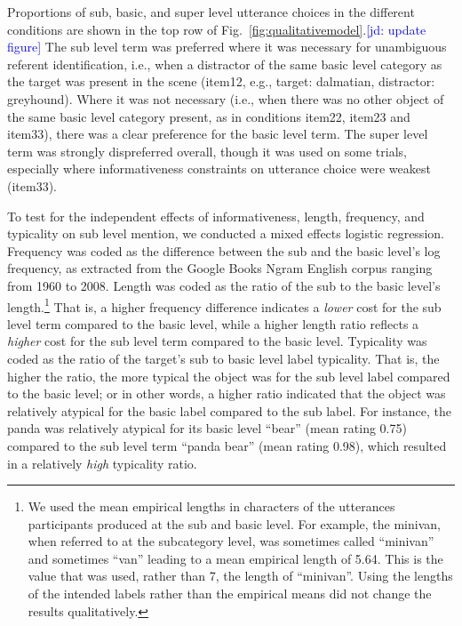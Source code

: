 \documentclass[10pt,letterpaper]{article}
\newcommand{\jd}[1]{\textcolor{Blue}{[jd: #1]}}
\newcommand{\figref}[1]{Fig.~\ref{#1}}
\begin{document}
Proportions of sub, basic, and super level utterance choices in the different conditions are shown in the top row of \figref{fig:qualitativemodel}.\jd{update figure} The sub level term was preferred where it was necessary for unambiguous referent identification, i.e., when a distractor of the same basic level category as the target was present in the scene (item12, e.g., target: dalmatian, distractor: greyhound). Where it was not necessary (i.e., when there was no other object of the same basic level category present, as in conditions item22, item23 and item33), there was a clear preference for the basic level term. The super level term was strongly dispreferred overall, though it was used on some trials, especially where informativeness constraints on utterance choice were weakest (item33). 
%

To test for the independent effects of informativeness, length, frequency, and typicality on sub level mention, we conducted a mixed effects logistic regression. Frequency was coded as the difference between the sub and the basic level's log frequency, as extracted from the Google Books Ngram English corpus ranging from 1960 to 2008. Length was coded as the ratio of the sub to the basic level's length.\footnote{We used the mean empirical lengths in characters of the utterances participants produced at the sub and basic level. For example, the minivan, when referred to at the subcategory level, was sometimes called ``minivan'' and sometimes ``van'' leading to a mean empirical length of 5.64. This is the value that was used, rather than 7, the length of ``minivan''. Using the lengths of the intended labels rather than the empirical means did not change the results qualitatively.} That is, a higher frequency difference indicates a \emph{lower} cost for the sub level term compared to the basic level, while a higher length ratio reflects a \emph{higher} cost for the sub level term compared to the basic level. Typicality was coded as the ratio of the target's sub to basic level label typicality. That is, the higher the ratio, the more typical the object was for the sub level label compared to the basic level; or in other words, a higher ratio indicated that the object was relatively atypical for the basic label compared to the sub label. For instance, the panda was relatively atypical for its basic level ``bear'' (mean rating 0.75) compared to the sub level term ``panda bear'' (mean rating 0.98), which resulted in a relatively \emph{high} typicality ratio.
\end{document}
